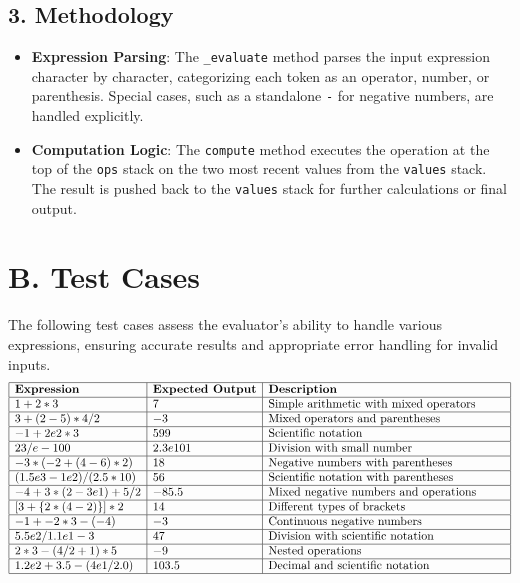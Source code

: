 \documentclass[a4paper]{article}
\begin{document}
\subsection*{3. Methodology}
\begin{itemize}
    \item \textbf{Expression Parsing}: The \texttt{\_evaluate} method parses the input expression character by character, categorizing each token as an operator, number, or parenthesis. Special cases, such as a standalone \texttt{-} for negative numbers, are handled explicitly.
    \item \textbf{Computation Logic}: The \texttt{compute} method executes the operation at the top of the \texttt{ops} stack on the two most recent values from the \texttt{values} stack. The result is pushed back to the \texttt{values} stack for further calculations or final output.
\end{itemize}

\section*{B. Test Cases}
The following test cases assess the evaluator's ability to handle various expressions, ensuring accurate results and appropriate error handling for invalid inputs.
\[
\begin{array}{|l|l|p{7cm}|}
\hline
\textbf{Expression} & \textbf{Expected Output} & \textbf{Description} \\
\hline
1 + 2 * 3 & 7 & Simple arithmetic with mixed operators \\
\hline
3 + (2 - 5) * 4 / 2 & -3 & Mixed operators and parentheses \\
\hline
-1 + 2e2 * 3 & 599 & Scientific notation \\
\hline
23/e-100 & 2.3e101 & Division with small number \\
\hline
-3 * (-2 + (4 - 6) * 2) & 18 & Negative numbers with parentheses \\
\hline
(1.5e3 - 1e2) / (2.5 * 10) & 56 & Scientific notation with parentheses \\
\hline
-4 + 3 * (2 - 3e1) + 5 / 2 & -85.5 & Mixed negative numbers and operations \\
\hline
[3 + \{2 * (4 - 2)\}] * 2\ & 14 & Different types of brackets \\
\hline
-1 + -2 * 3 - (-4) & -3 & Continuous negative numbers \\
\hline
5.5e2 / 1.1e1 - 3 & 47 & Division with scientific notation \\
\hline
2 * 3 - (4 / 2 + 1) * 5 & -9 & Nested operations \\
\hline
1.2e2 + 3.5 - (4e1 / 2.0) & 103.5 & Decimal and scientific notation \\
\hline
\end{array}
\]
\end{document}
